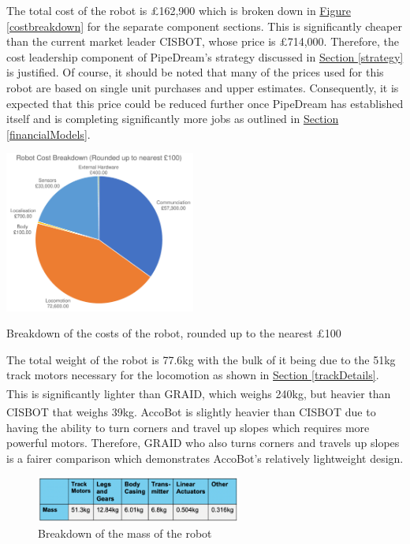 \documentclass[11pt]{article}		%
\newcommand{\supercite}[1]{\textsuperscript{\cite{#1}}}		%
\newcommand{\figref}[1]{\hyperref[#1]{Figure \ref*{#1}}}    %
\newcommand{\sectref}[1]{\hyperref[#1]{Section \ref*{#1}}}     %
\begin{document}
   		    The total cost of the robot is £162,900 which is broken down in \figref{costbreakdown} for the separate component sections. This is significantly cheaper than the current market leader CISBOT, whose price is £714,000. Therefore, the cost leadership component of PipeDream's strategy discussed in \sectref{strategy} is justified. 
         Of course, it should be noted that many of the prices used for this robot are based on single unit purchases and upper estimates. Consequently, it is expected that this price could be reduced further once PipeDream has established itself and is completing significantly more jobs as outlined in \sectref{financialModels}. 
   		
   	    \begin{floatingfigure}[r]{0.5\textwidth}
			\centering
			\includegraphics[width=0.47\textwidth]{costBreakdown}
			\caption{Breakdown of the costs of the robot, rounded up to the nearest £100}
			\label{costbreakdown}
		\end{floatingfigure}
        \hspace*{2ex}The total weight of the robot is 77.6kg with the bulk of it being due to the 51kg track motors necessary for the locomotion as shown in \sectref{trackDetails}. This is significantly lighter than GRAID, which weighs 240kg\supercite{graidweight}, but heavier than CISBOT that weighs 39kg\supercite{cisbotweight}. AccoBot is slightly heavier than CISBOT due to having the ability to turn corners and travel up slopes which requires more powerful motors. Therefore, GRAID who also turns corners and travels up slopes is a fairer comparison which demonstrates AccoBot's relatively lightweight design. 
            \begin{figure}[h]
				\centering
				\includegraphics[width=0.6\textwidth]{weightsbreaks.png}
				\caption{Breakdown of the mass of the robot}
				\label{massbreakdown}
			\end{figure}
    
\end{document}
